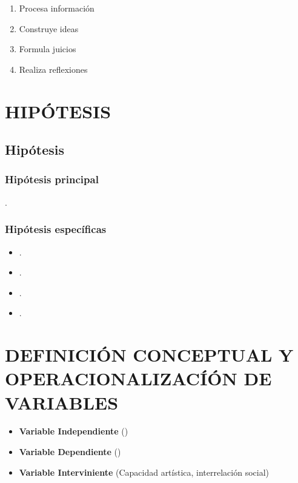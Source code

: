 \documentclass[12pt,a4paper]{article}
\begin{document}
\begin{enumerate}
	\item Procesa información
	\item Construye ideas
	\item Formula juicios
	\item Realiza reflexiones
\end{enumerate}
\flushbottom \printglossary[numberedsection,nonumberlist,title=Definiciones  de términos básicos]








\section{HIPÓTESIS}
\subsection{Hipótesis}
\subsubsection{Hipótesis principal}
\hipotesis.
\subsubsection{Hipótesis específicas}
\begin{itemize}
	\item \hipotesise.
	\item \hipotesisee.
	\item \hipotesiseee.
	\item \hipotesiseeee.
\end{itemize}

\section{DEFINICIÓN CONCEPTUAL Y OPERACIONALIZACÍÓN DE VARIABLES }
\begin{itemize}
	\item \textbf{Variable Independiente} (\variablei)
	\item \textbf{Variable Dependiente} (\variabled)
	\item \textbf{Variable Interviniente} (Capacidad artística, interrelación social)
\end{itemize}
\end{document}
